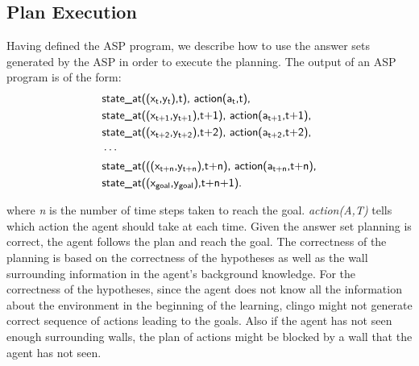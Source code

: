 \subsection{Plan Execution}
\label{subsec:plan_execution}
Having defined the ASP program, we describe how to use the answer sets generated by the ASP in order to execute the planning.
The output of an ASP program is of the form:
\begin{equation}
\begin{split}
&\textsf{state\_at((x\textsubscript{t},y\textsubscript{t}),t), action(a\textsubscript{t},t),}\\
&\textsf{state\_at((x\textsubscript{t+1},y\textsubscript{t+1}),t+1), action(a\textsubscript{t+1},t+1),}\\
&\textsf{state\_at((x\textsubscript{t+2},y\textsubscript{t+2}),t+2), action(a\textsubscript{t+2},t+2),}\\
&\cdots\\
&\textsf{state\_at(((x\textsubscript{t+n},y\textsubscript{t+n}),t+n), action(a\textsubscript{t+n},t+n),}\\
&\textsf{state\_at((x\textsubscript{goal},y\textsubscript{goal}),t+n+1).} 
\end{split}
\end{equation}

where \textit{n} is the number of time steps taken to reach the goal. 
\textit{action(A,T)} tells which action the agent should take at each time.
Given the answer set planning is correct, the agent follows the plan and reach the goal. 
The correctness of the planning is based on the correctness of the hypotheses as well as the wall surrounding information in the agent's background knowledge. 
For the correctness of the hypotheses, since the agent does not know all the information about the environment in the beginning of the learning,   
clingo might not generate correct sequence of actions leading to the goals.
Also if the agent has not seen enough surrounding walls, the plan of actions might be blocked by a wall that the agent has not seen. 


